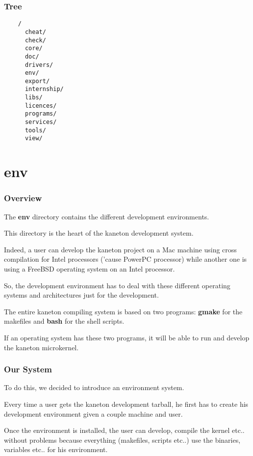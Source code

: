 
\begin{frame}[containsverbatim]
  \frametitle{Tree}

  \begin{center}

  \begin{verbatim}
    /
      cheat/
      check/
      core/
      doc/
      drivers/
      env/
      export/
      internship/
      libs/
      licences/
      programs/
      services/
      tools/
      view/
  \end{verbatim}

  \end{center}
\end{frame}

%
%

\section{env}


\begin{frame}
  \frametitle{Overview}

  The \textbf{env} directory contains the different development environments.

  \nl

  This directory is the heart of the kaneton development system.

  \nl

  Indeed, a user can develop the kaneton project on a Mac machine using
  cross compilation for Intel processors ('cause PowerPC processor)
  while another one is using a FreeBSD operating system on an Intel processor.

  \nl

  So, the development environment has to deal with these different operating
  systems and architectures just for the development.

  \nl

  The entire kaneton compiling system is based on two programs:
  \textbf{gmake} for the makefiles and \textbf{bash} for the shell scripts.

  \nl

  If an operating system has these two programs, it will be able to run
  and develop the kaneton microkernel.
\end{frame}


\begin{frame}
  \frametitle{Our System}

  To do this, we decided to introduce an environment system.

  \nl

  Every time a user gets the kaneton development tarball, he first has to
  create his development environment given a couple machine and user.

  \nl

  Once the environment is installed, the user can develop, compile the kernel
  etc.. without problems because everything (makefiles, scripts etc..) use
  the binaries, variables etc.. for his environment.
\end{frame}

